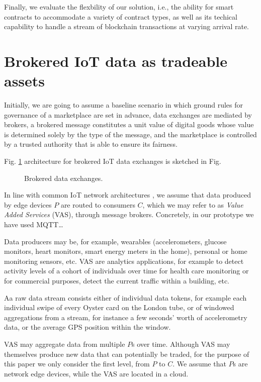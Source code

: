 \documentclass[conference]{IEEEtran}
\begin{document}
Finally, we evaluate the flexbility of our solution, i.e., the ability for smart contracts to accommodate a variety of contract types, as well as its techical capability to handle a stream of blockchain transactions at varying arrival rate.

\section{Brokered IoT data as tradeable assets}

Initially, we are going to assume a baseline scenario in which ground rules for governance of a marketplace are set in advance, data exchanges are mediated by brokers, a brokered message constitutes a unit value of digital goods whose value is determined solely by the type of the message, and the marketplace is controlled by a trusted authority that is able to ensure its fairness.

Fig. \ref{fig:reference-architecture} architecture for brokered IoT data exchanges is sketched in Fig. 

\begin{figure}
\caption{Brokered data exchanges.}
\label{fig:reference-architecture}
\end{figure}


In line with common IoT network architectures , we assume that data produced by edge devices $ P $ are routed to consumers $ C $, which we may refer to as \textit{Value Added Services} (VAS), through message brokers. Concretely, in our prototype we have used MQTT… 

Data producers may be, for example, wearables (accelerometers, glucose monitors, heart monitors, smart energy meters in the home), personal or home monitoring sensors, etc.
VAS are analytics applications, for example to detect activity levels of a cohort of individuals over time for health care monitoring or for commercial purposes, detect the current traffic within a building, etc.

Aa raw data stream consists either of individual data tokens, for example each individual swipe of every Oyster card on the London tube, or of windowed aggregations from a stream, for instance a few seconds’ worth of accelerometry data, or the average GPS position within the window.

VAS may aggregate data from multiple $ P $s over time. Although VAS may themselves produce new data that can potentially be traded, for the purpose of this paper we only consider the first level, from $ P $ to $ C $. We assume that $ P $s are network edge devices, while the VAS are located in a cloud.
\end{document}
